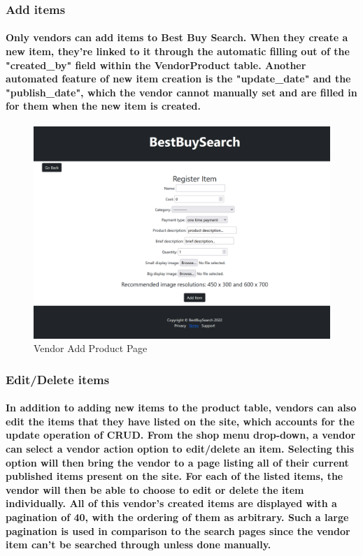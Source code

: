\documentclass[sigconf]{acmart}
\begin{document}
\subsubsection{Add items}

\paragraph{ Only vendors can add items to Best Buy Search. When they create a new item, they're linked to it through the automatic filling out of the "created\_by" field within the VendorProduct table. Another automated feature of new item creation is the "update\_date" and the "publish\_date", which the vendor cannot manually set and are filled in for them when the new item is created. }   

\begin{figure}[H]
    \centering
    \includegraphics[scale=0.2]{VendorAdd.PNG}
    \caption{Vendor Add Product Page}
    \label{fig:my_label}
\end{figure}

\subsubsection{Edit/Delete items}

\paragraph{In addition to adding new items to the product table, vendors can also edit the items that they have listed on the site, which accounts for the update operation of CRUD. From the shop menu drop-down, a vendor can select a vendor action option to edit/delete an item. Selecting this option will then bring the vendor to a page listing all of their current published items present on the site. For each of the listed items, the vendor will then be able to choose to edit or delete the item individually. All of this vendor's created items are displayed with a pagination of 40, with the ordering of them as arbitrary. Such a large pagination is used in comparison to the search pages since the vendor item can't be searched through unless done manually. }
\end{document}
